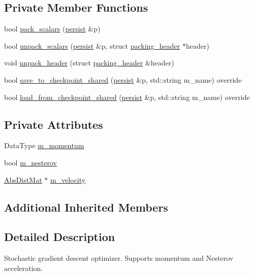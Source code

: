 \subsection*{Private Member Functions}
\begin{DoxyCompactItemize}
\item 
bool \hyperlink{classlbann_1_1sgd_ab95756a63ec3fa0100d436a5a9addfeb}{pack\+\_\+scalars} (\hyperlink{classlbann_1_1persist}{persist} \&p)
\item 
bool \hyperlink{classlbann_1_1sgd_a2b4a91cbb155ed94a185db79fdbf6284}{unpack\+\_\+scalars} (\hyperlink{classlbann_1_1persist}{persist} \&p, struct \hyperlink{structlbann_1_1sgd_1_1packing__header}{packing\+\_\+header} $\ast$header)
\item 
void \hyperlink{classlbann_1_1sgd_a3afe5aa1f1861c390472ff6f53093386}{unpack\+\_\+header} (struct \hyperlink{structlbann_1_1sgd_1_1packing__header}{packing\+\_\+header} \&header)
\item 
bool \hyperlink{classlbann_1_1sgd_a78ad11ca7424d50a9f2ba29e5f725e21}{save\+\_\+to\+\_\+checkpoint\+\_\+shared} (\hyperlink{classlbann_1_1persist}{persist} \&p, std\+::string m\+\_\+name) override
\item 
bool \hyperlink{classlbann_1_1sgd_aa3e3237a59b0593d7caf7357b7c181cf}{load\+\_\+from\+\_\+checkpoint\+\_\+shared} (\hyperlink{classlbann_1_1persist}{persist} \&p, std\+::string m\+\_\+name) override
\end{DoxyCompactItemize}
\subsection*{Private Attributes}
\begin{DoxyCompactItemize}
\item 
Data\+Type \hyperlink{classlbann_1_1sgd_a2e56d66d350debcf0d2c3ad76c214074}{m\+\_\+momentum}
\item 
bool \hyperlink{classlbann_1_1sgd_a82da488e5d1530f50f67cd4ea30909cb}{m\+\_\+nesterov}
\item 
\hyperlink{base_8hpp_a9a697a504ae84010e7439ffec862b470}{Abs\+Dist\+Mat} $\ast$ \hyperlink{classlbann_1_1sgd_a27f2d893014cef8357edffb63bf649f0}{m\+\_\+velocity}
\end{DoxyCompactItemize}
\subsection*{Additional Inherited Members}


\subsection{Detailed Description}
Stochastic gradient descent optimizer. Supports momentum and Nesterov acceleration. 

